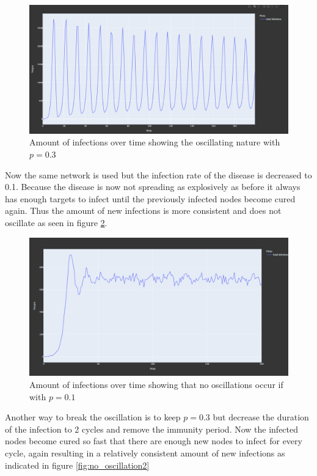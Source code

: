 \begin{figure}[!ht]
    \centering
    \includegraphics[width=0.75\linewidth]{images/oscillation_infections3.png}
    \caption{Amount of infections over time showing the oscillating nature with $p = 0.3$}
    \label{fig:oscillation_p03}
\end{figure}
\clearpage

Now the same network is used but the infection rate of the disease is decreased to 0.1.
Because the disease is now not spreading as explosively as before it always has enough targets
to infect until the previously infected nodes become cured again. Thus the amount of new 
infections is more consistent and does not oscillate as seen in figure \ref{fig:no_oscillation}.

\begin{figure}[!ht]
    \centering
    \includegraphics[width=0.75\linewidth]{images/no_oscillation.png}
    \caption{Amount of infections over time showing that no oscillations occur if with $p = 0.1$}
    \label{fig:no_oscillation}
\end{figure}

Another way to break the oscillation is to keep $p=0.3$ but decrease the duration of the infection to 2 cycles 
and remove the immunity period. Now the infected nodes become cured so fast that there are
enough new nodes to infect for every cycle, again resulting in a relatively consistent
amount of new infections as indicated in figure \ref{fig:no_oscillation2}

